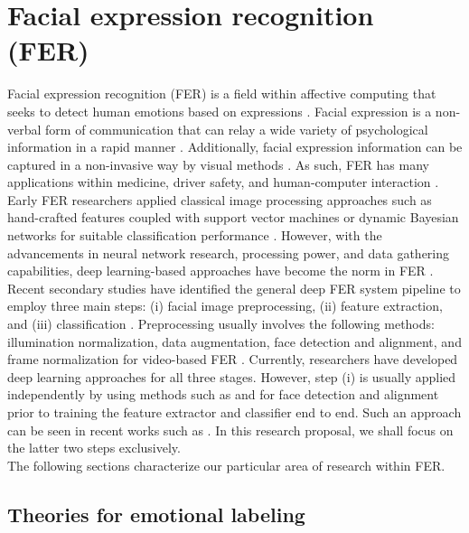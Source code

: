 \section{Facial expression recognition (FER)}

Facial expression recognition (FER) is a field within affective computing that seeks to detect human emotions based on expressions \cite{karnati2023survey}.
Facial expression is a non-verbal form of communication that can relay a wide variety of psychological information in a rapid manner \cite{sajjad2023survey}.
Additionally, facial expression information can be captured in a non-invasive way by visual methods \cite{umer2022augment}.
As such, FER has many applications within medicine, driver safety, and human-computer interaction \cite{li2022survey}.\\

Early FER researchers applied classical image processing approaches such as hand-crafted features coupled with support vector machines or dynamic Bayesian networks for suitable classification performance \cite{canal2022survey}.
However, with the advancements in neural network research, processing power, and data gathering capabilities, deep learning-based approaches have become the norm in FER \cite{li2022survey, karnati2023survey, canal2022survey}.\\

Recent secondary studies have identified the general deep FER system pipeline to employ three main steps: (i) facial image preprocessing, (ii) feature extraction, and (iii) classification \cite{li2022survey, karnati2023survey}. 
Preprocessing usually involves the following methods: illumination normalization, data augmentation, face detection and alignment, and frame normalization for video-based FER \cite{karnati2023survey}.
Currently, researchers have developed deep learning approaches for all three stages.
However, step (i) is usually applied independently by using methods such as \cite{mtcnn2016} and \cite{retinaface2020} for face detection and alignment prior to training the feature extractor and classifier end to end.
Such an approach can be seen in recent works such as \cite{eff-face2021, apvit2023, xue2021transfer, ma2023asf}.
In this research proposal, we shall focus on the latter two steps exclusively.\\

The following sections characterize our particular area of research within FER.

\subsection{Theories for emotional labeling} 

